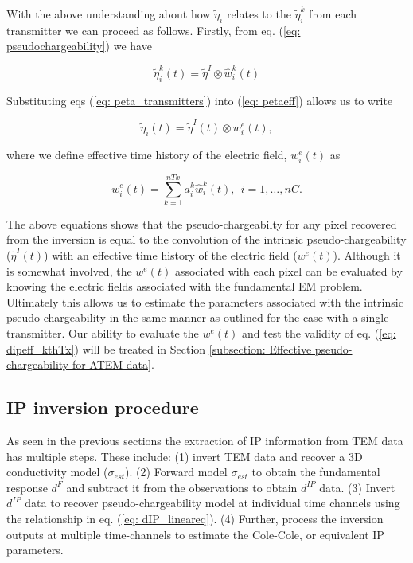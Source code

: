 \documentclass[extra,mreferee]{gji}
\newcommand{\peta}{\tilde{\eta}}
\newcommand{\dip}{d^{IP}}
\begin{document}
With the above understanding about how $\peta_i$ relates to the $\peta_i^k$ from each transmitter we can proceed  as follows. Firstly, from eq. (\ref{eq: pseudochargeability}) we have 
\begin{linenomath*}
\begin{equation}
  \peta_i^k(t) =\peta^I \otimes \hat{w}^{k}_i(t) 
  \label{eq: peta_transmitters}
\end{equation}
\end{linenomath*}
Substituting eqs (\ref{eq: peta_transmitters}) into (\ref{eq: petaeff}) allows us to write
\begin{linenomath*}
\begin{equation}
  \peta_i(t) = \peta^I(t) \otimes w^e_i(t),
\end{equation}
\end{linenomath*}
where we define effective time history of the electric field, $w^e_i(t)$ as 
\begin{linenomath*}
\begin{equation}
  w^e_i(t)= \sum_{k=1}^{nTx} a^k_i \hat{w}^{k}_i(t), \ \ i=1, \ldots, nC.
  \label{eq: we_eff}
\end{equation}
\end{linenomath*}

The above equations shows that the pseudo-chargeabilty for any pixel recovered from the inversion is equal to the convolution of the intrinsic pseudo-chargeability ($\peta^I(t)$) with an effective time history of the electric field ($w^e(t)$). Although it is somewhat involved, the $w^e(t)$ associated with each pixel can be evaluated by knowing the electric fields associated with the fundamental EM problem. Ultimately this allows us to estimate the parameters associated with the intrinsic pseudo-chargeability in the same manner as outlined for the case with a single transmitter. Our ability to evaluate the $w^e(t)$ and test the validity of eq. (\ref{eq: dipeff_kthTx}) will be treated in Section \ref{subsection: Effective pseudo-chargeability for ATEM data}.  


\subsection{IP inversion procedure}
As seen in the previous sections the extraction of IP information from TEM data has multiple steps. These include: (1) invert TEM data and recover a 3D conductivity model ($\sigma_{est}$). 
(2) Forward model $\sigma_{est}$ to obtain the fundamental response $d^F$ and subtract it from the observations to obtain $\dip$ data.
(3) Invert  $\dip$ data to recover pseudo-chargeability model at individual time channels using the relationship in eq. (\ref{eq: dIP_lineareq}). 
(4) Further, process the inversion outputs at multiple time-channels  to estimate the Cole-Cole, or equivalent IP parameters.
\end{document}
